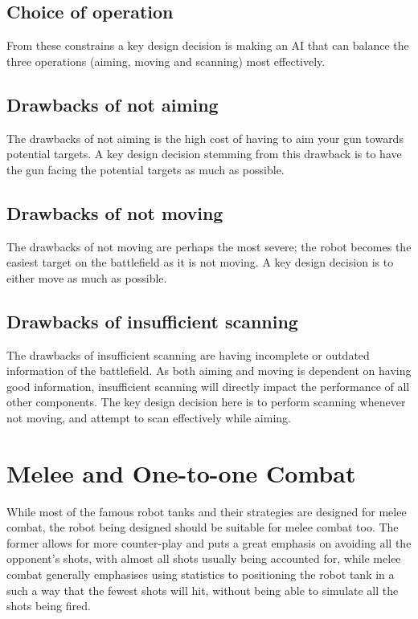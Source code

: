 \documentclass[11pt]{report}
\begin{document}
\subsection{Choice of operation}
From these constrains a key design decision is making an AI that can balance the three operations (aiming, moving and scanning) most effectively.

\subsection{Drawbacks of not aiming}
The drawbacks of not aiming is the high cost of having to aim your gun towards potential targets. A key design decision stemming from this drawback is to have the gun facing the potential targets as much as possible.

\subsection{Drawbacks of not moving}
The drawbacks of not moving are perhaps the most severe; the robot becomes the easiest target on the battlefield as it is not moving. A key design decision is to either move as much as possible.

\subsection{Drawbacks of insufficient scanning}
The drawbacks of insufficient scanning are having incomplete or outdated information of the battlefield. As both aiming and moving is dependent on having good information, insufficient scanning will directly impact the performance of all other components. The key design decision here is to perform scanning whenever not moving, and attempt to scan effectively while aiming.

\section{Melee and One-to-one Combat}
While most of the famous robot tanks and their strategies are designed for melee combat, the robot being designed should be suitable for melee combat too. The former allows for more counter-play and puts a great emphasis on avoiding all the opponent's shots, with almost all shots usually being accounted for, while melee combat generally emphasises using statistics to positioning the robot tank in a such a way that the fewest shots will hit, without being able to simulate all the shots being fired.
\end{document}
